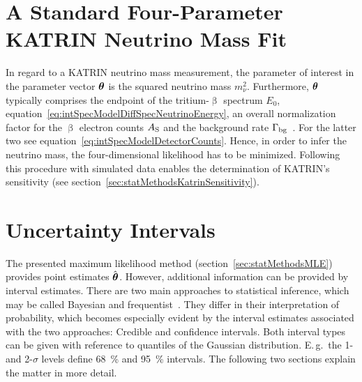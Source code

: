 \section{A Standard Four-Parameter KATRIN Neutrino Mass Fit}
\label{sec:statMethodsStandardFit}
In regard to a KATRIN neutrino mass measurement, the parameter of interest in the parameter vector $\boldsymbol{\mathbf{\theta}}$ is the squared neutrino mass $m_\nu^2$. Furthermore, $\boldsymbol{\mathbf{\theta}}$ typically comprises the endpoint of the tritium-$\upbeta$ spectrum $E_0$, equation~\eqref{eq:intSpecModelDiffSpecNeutrinoEnergy}, an overall normalization factor for the $\upbeta$ electron counts $A_{\mathrm{S}}$ and the background rate $\Gamma_{\mathrm{bg}}$~\cite{Kleesiek2014,Angrik:2005ep}. For the latter two see equation~\eqref{eq:intSpecModelDetectorCounts}. Hence, in order to infer the neutrino mass, the four-dimensional likelihood has to be minimized. Following this procedure with simulated data enables the determination of KATRIN's sensitivity (see section~\ref{sec:statMethodsKatrinSensitivity}).

\section{Uncertainty Intervals}
\label{sec:statMethodsUncertaintyIntervals}
The presented maximum likelihood method (section~\ref{sec:statMethodsMLE}) provides point estimates $\hat{\boldsymbol{\mathbf{\theta}}}$. However, additional information can be provided by interval estimates. There are two main approaches to statistical inference, which may be called Bayesian and frequentist~\cite{ReviewOfParticlePhysics}. They differ in their interpretation of probability, which becomes especially evident by the interval estimates associated with the two approaches: Credible and confidence intervals. Both interval types can be given with reference to quantiles of the Gaussian distribution. E.\,g.~the 1- and 2-$\sigma$ levels define \SI{68}{\percent} and \SI{95}{\percent} intervals. The following two sections explain the matter in more detail.


